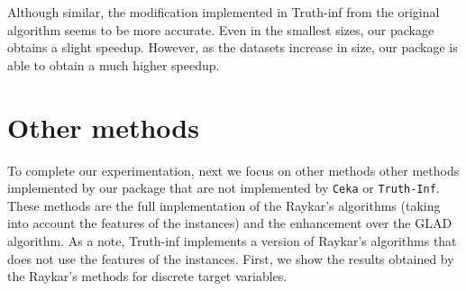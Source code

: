 \documentclass[letterpaper,10pt,english]{sphinxmanual}
\begin{document}
Although similar, the modification implemented in Truth-inf from the original algorithm seems to be more
accurate. 
Even in the smallest sizes, our package obtains a slight speedup. However, as the datasets increase in size,
our package is able to obtain a much higher speedup. 

\section{Other methods}
\label{\detokenize{package/other:other-methods}}
To complete our experimentation, next we focus on other methods other methods implemented by our package that
are not implemented by \texttt{Ceka} or \texttt{Truth-Inf}. These methods are the full implementation of the Raykar’s
algorithms (taking into account the features of the instances) and the enhancement over the GLAD algorithm. As a
note, Truth-inf implements a version of Raykar’s algorithms that does not use the features of the instances. First,
we show the results obtained by the Raykar’s methods for discrete target variables.
\end{document}
